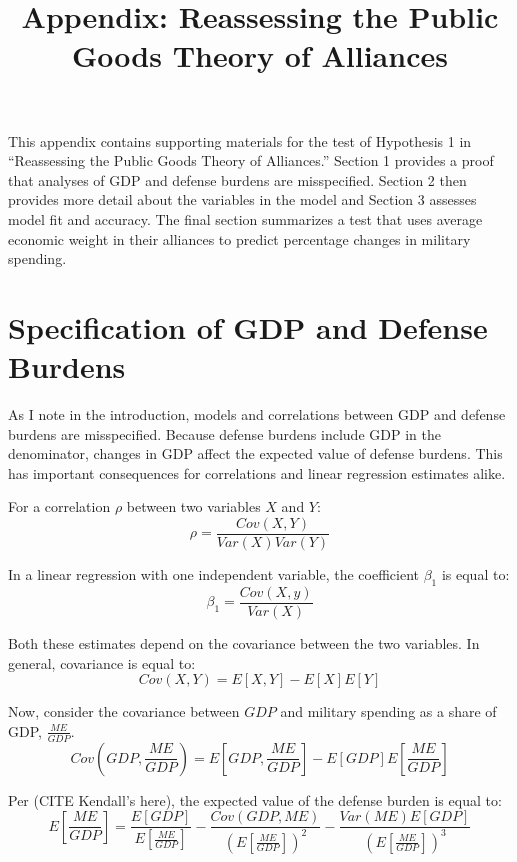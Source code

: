 \documentclass[12pt]{article}
\title{
\textbf{Appendix: Reassessing the Public Goods Theory of Alliances}
	}
\begin{document}
\maketitle 

\doublespace

This appendix contains supporting materials for the test of Hypothesis 1 in ``Reassessing the Public Goods Theory of Alliances.'' 
Section 1 provides a proof that analyses of GDP and defense burdens are misspecified. 
Section 2 then provides more detail about the variables in the model and Section 3 assesses model fit and accuracy. 
The final section summarizes a test that uses average economic weight in their alliances to predict percentage changes in military spending. 


\section{Specification of GDP and Defense Burdens} 

As I note in the introduction, models and correlations between GDP and defense burdens are misspecified. 
Because defense burdens include GDP in the denominator, changes in GDP affect the expected value of defense burdens. 
This has important consequences for correlations and linear regression estimates alike. 


For a correlation $\rho$ between two variables $X$ and $Y$:
\begin{equation}
\rho = \frac{Cov(X,Y)}{Var(X)Var(Y)} 
\end{equation}

In a linear regression with one independent variable, the coefficient $\beta_1$ is equal to:
\begin{equation}
\beta_1 = \frac{Cov(X,y)}{Var(X)} 
\end{equation} 

Both these estimates depend on the covariance between the two variables. 
In general, covariance is equal to:
\begin{equation}
Cov(X, Y) = E[X,Y] - E[X] E[Y]
\end{equation}

Now, consider the covariance between $GDP$ and military spending as a share of GDP, $\frac{ME}{GDP}$. 
\begin{equation}
Cov\left(GDP, \frac{ME}{GDP} \right) = E\left[GDP, \frac{ME}{GDP} \right] - E[GDP] E\left[\frac{ME}{GDP} \right]
\end{equation}

Per (CITE Kendall's here), the expected value of the defense burden is equal to:
\begin{equation}
E\left[\frac{ME}{GDP} \right] = \frac{E[GDP]}{E\left[\frac{ME}{GDP} \right]} - \frac{Cov(GDP, ME)}{\left(E\left[\frac{ME}{GDP} \right]\right)^2} - \frac{Var(ME) E[GDP]}{\left(E\left[\frac{ME}{GDP} \right]\right)^3}
\end{equation}
\end{document}

